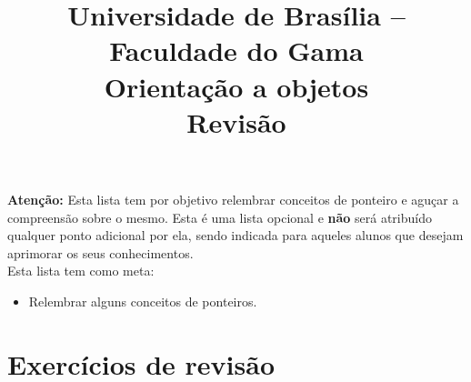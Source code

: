 \documentclass[a4paper,10pt]{article}
\title{ \textbf{Universidade de Brasília -- Faculdade do Gama \\ Orientação a 
objetos \\ Revisão }}
\date{}
\begin{document}
\maketitle

\paragraph{}
\textbf{Atenção:} Esta lista tem por objetivo relembrar conceitos de ponteiro e 
aguçar a compreensão sobre o mesmo. Esta é uma lista opcional e \textbf{não} 
será atribuído qualquer ponto adicional por ela, sendo indicada para aqueles 
alunos que desejam aprimorar os seus conhecimentos. \\
Esta lista tem como meta:
\begin{itemize}
 \item Relembrar alguns conceitos de ponteiros.
\end{itemize}

\section{Exercícios de revisão}
\end{document}
